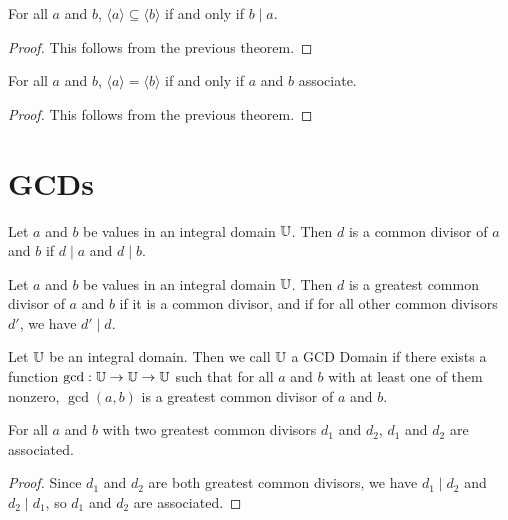 \documentclass[../../math.tex]{subfiles}
\begin{document}
\begin{theorem} \label{principle_ideal_sub}
    For all $a$ and $b$, $\langle a \rangle \subseteq \langle b \rangle$ if and
    only if $b \mid a$.
\end{theorem}
\begin{proof}
    This follows from the previous theorem.
\end{proof}

\begin{theorem} \label{principle_ideal_associates}
    For all $a$ and $b$, $\langle a \rangle = \langle b \rangle$ if and only if
    $a$ and $b$ associate.
\end{theorem}
\begin{proof}
    This follows from the previous theorem.
\end{proof}

\section{GCDs}

\begin{definition}
    Let $a$ and $b$ be values in an integral domain $\mathbb{U}$.  Then $d$ is a common
    divisor of $a$ and $b$ if $d \mid a$ and $d \mid b$.
\end{definition}

\begin{definition}
    Let $a$ and $b$ be values in an integral domain $\mathbb{U}$.  Then $d$ is a
    greatest common divisor of $a$ and $b$ if it is a common divisor, and if for
    all other common divisors $d'$, we have $d' \mid d$.
\end{definition}

\begin{class}
    Let $\mathbb{U}$ be an integral domain.  Then we call $\mathbb{U}$ a GCD Domain if there
    exists a function $\gcd : \mathbb{U} \to \mathbb{U} \to \mathbb{U}$ such that for all $a$ and $b$
    with at least one of them nonzero, $\gcd(a, b)$ is a greatest common divisor
    of $a$ and $b$.
\end{class}

\begin{theorem} \label{gcd_associates}
    For all $a$ and $b$ with two greatest common divisors $d_1$ and $d_2$, $d_1$
    and $d_2$ are associated.
\end{theorem}
\begin{proof}
    Since $d_1$ and $d_2$ are both greatest common divisors, we have $d_1 \mid
    d_2$ and $d_2 \mid d_1$, so $d_1$ and $d_2$ are associated.
\end{proof}
\end{document}
